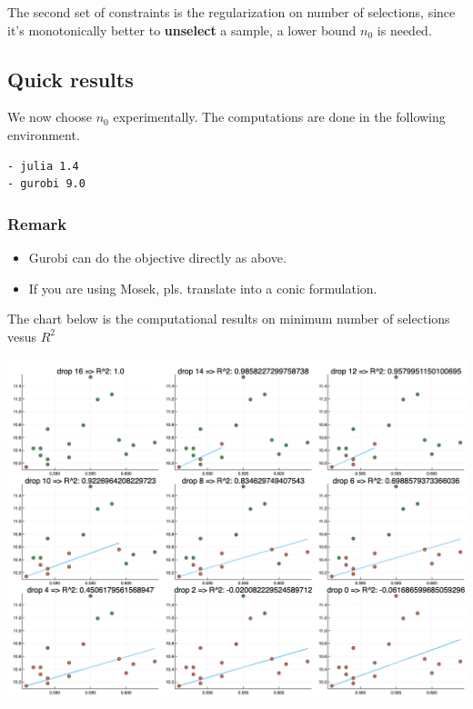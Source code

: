 \documentclass[
  10pt,
  a4paper,
,tablecaptionabove
]{scrartcl}
\providecommand{\tightlist}{%
  \setlength{\itemsep}{0pt}\setlength{\parskip}{0pt}}
\begin{document}
The second set of constraints is the regularization on number of
selections, since it's monotonically better to \textbf{unselect} a
sample, a lower bound \(n_0\) is needed.

\hypertarget{quick-results}{%
\subsection{Quick results}\label{quick-results}}

We now choose \(n_0\) experimentally. The computations are done in the
following environment.

\begin{verbatim}
- julia 1.4
- gurobi 9.0
\end{verbatim}

\hypertarget{remark}{%
\subsubsection{Remark}\label{remark}}

\begin{itemize}
\tightlist
\item
  Gurobi can do the objective directly as above.
\item
  If you are using Mosek, pls. translate into a conic formulation.
\end{itemize}

The chart below is the computational results on minimum number of
selections vesus \(R^2\)

\includegraphics{src/output_filename.png}
\end{document}
